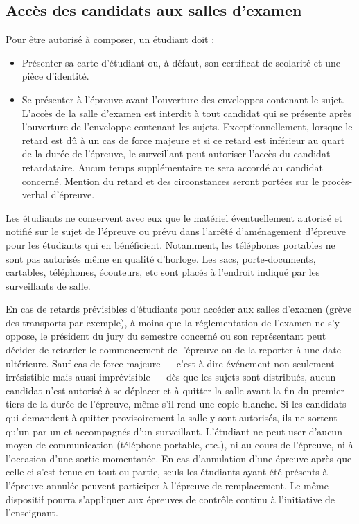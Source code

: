 \documentclass[a4paper,11pt]{article}
\begin{document}
\subsection{Accès des candidats aux salles d'examen}
Pour être autorisé à composer, un étudiant doit :
\begin{itemize}
	\item Présenter sa carte d'étudiant ou, à défaut, son certificat de scolarité et une pièce d'identité.
	\item Se présenter à l'épreuve avant l'ouverture des enveloppes contenant le sujet. L'accès de la salle d'examen est interdit à tout candidat qui se présente après l'ouverture de l'enveloppe contenant les sujets. Exceptionnellement, lorsque le retard est dû à un cas de force majeure et si ce retard est inférieur au quart de la durée de l'épreuve, le surveillant peut autoriser l'accès du candidat retardataire. Aucun temps supplémentaire ne sera accordé au candidat concerné. Mention du retard et des circonstances seront portées sur le procès-verbal d'épreuve.
\end{itemize}

Les étudiants ne conservent avec eux que le matériel éventuellement autorisé et notifié sur le sujet de l'épreuve ou prévu dans l'arrêté d'aménagement d'épreuve pour les étudiants qui en bénéficient. Notamment, les téléphones portables ne sont pas autorisés même en qualité d'horloge. Les sacs, porte-documents, cartables, téléphones, écouteurs, etc sont placés à l'endroit indiqué par les surveillants de salle.

En cas de retards prévisibles d'étudiants pour accéder aux salles d'examen (grève des transports par exemple), à moins que la réglementation de l'examen ne s'y oppose, le président du jury du semestre concerné ou son représentant peut décider de retarder le commencement de l'épreuve ou de la reporter à une date ultérieure.
Sauf cas de force majeure --- c'est-à-dire événement non seulement irrésistible mais aussi imprévisible --- dès que les sujets sont distribués, aucun candidat n'est autorisé à se déplacer et à quitter la salle avant la fin du premier tiers de la durée de l'épreuve, même s'il rend une copie blanche.
Si les candidats qui demandent à quitter provisoirement la salle y sont autorisés, ils ne sortent qu'un par un et accompagnés d'un surveillant.
L'étudiant ne peut user d'aucun moyen de communication (téléphone portable, etc.), ni au cours de l'épreuve, ni à l'occasion d'une sortie momentanée.
En cas d'annulation d'une épreuve après que celle-ci s'est tenue en tout ou partie, seuls les étudiants ayant été présents à l'épreuve annulée peuvent participer à l'épreuve de remplacement. Le même dispositif pourra s'appliquer aux épreuves de contrôle continu à l'initiative de l'enseignant.
\end{document}
